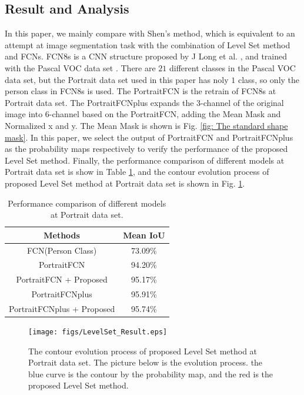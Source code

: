 \subsection{Result and Analysis}\label{subsec: Result and Analysis}
In this paper, we mainly compare with Shen's method, which is equivalent to an attempt at image segmentation task with the combination of Level Set method and FCNs. FCN8s is a CNN structure proposed by J Long et al. \cite{FCN-original:long2015fully}, and trained with the Pascal VOC data set \cite{FCN:DataSet:Everingham15}. There are $21$ different classes in the Pascal VOC data set, but the Portrait data set used in this paper has noly $1$ class, so only the person class in FCN8s is used. The PortraitFCN is the retrain of FCN8s at Portrait data set. The PortraitFCNplus expands the $3$-channel of the original image into $6$-channel based on the PortraitFCN, adding the Mean Mask and Normalized x and y. The Mean Mask is shown is Fig. \ref{fig: The standard shape mask}. In this paper, we select the output of PortraitFCN and PortraitFCNplus as the probability maps respectively to verify the performance of the proposed Level Set method.
Finally, the performance comparison of different models at Portrait data set is show in Table \ref{table: Performance comparson of different models}, and the contour evolution process of proposed Level Set method at Portrait data set is shown in Fig. \ref{fig: The contour evolution process of proposed Level Set method at Portrait data set}.
\begin{table}[h]
    \centering
    \caption{Performance comparison of different models at Portrait data set.}\label{table: Performance comparson of different models}
    \begin{tabular}{c|c}
        \hline
        \hline
        \textbf{Methods} & \textbf{Mean IoU} \\
        \hline
        FCN(Person Class) & 73.09\% \\
        PortraitFCN & 94.20\% \\
        PortraitFCN + Proposed & 95.17\% \\
        PortraitFCNplus & 95.91\% \\
        PortraitFCNplus + Proposed & 95.74\% \\
        \hline
        \hline
    \end{tabular}
\end{table}
\begin{figure}[h]
    \centering
    \texttt{[image: figs/LevelSet\_Result.eps]}
    \caption{The contour evolution process of proposed Level Set method at Portrait data set. The picture below is the evolution process. the blue curve is the contour by the probability map, and the red is the proposed Level Set method.}
    \label{fig: The contour evolution process of proposed Level Set method at Portrait data set}
\end{figure}

